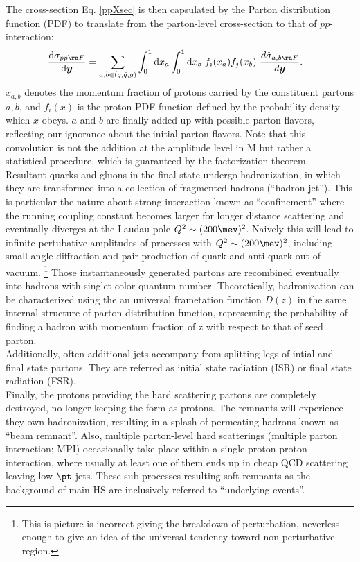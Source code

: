 The cross-section Eq. \ref{ppXsec} is then capsulated by the Parton distribution function (PDF) to translate from the parton-level cross-section to that of $pp$-interaction:
\begin{align}
\frac{\mathrm{d}\sigma_{pp\ra F}}{\mathrm{d}\bm{y}} & = \sum_{a,b\in (q,\bar{q},g)} \int_0^1 \mathrm{d}x_a \int_0^1 \mathrm{d}x_b \,\, f_i (x_a) f_j (x_b) \,\, \frac{d\hat{\sigma}_{a,b \ra F}}{d\bm{y}}.
\label{ppXsecWithPDF}
\end{align}
$x_{a,b}$ denotes the momentum fraction of protons carried by the constituent partons $a,b$, and $f_i(x)$ is the proton PDF function defined by the probability density which $x$ obeys. $a$ and $b$ are finally added up with possible parton flavors, reflecting our ignorance about the initial parton flavors.
Note that this convolution is not the addition at the amplitude level in $\mathrm{M}$ but rather a statistical procedure, which is guaranteed by the factorization theorem. \\

Resultant quarks and gluons in the final state undergo hadronization, in which they are transformed into a collection of fragmented hadrons (``hadron jet''). This is particular the nature about strong interaction known as ``confinement'' where the running coupling constant becomes larger for longer distance scattering and eventually diverges at the Laudau pole $Q^2\sim (200\mev)^2$. Naively this will lead to infinite pertubative amplitudes of processes with $Q^2\sim (200\mev)^2$, including small angle diffraction and pair production of quark and anti-quark out of vacuum. 
\footnote{This is picture is incorrect giving the breakdown of perturbation, neverless enough to give an idea of the universal tendency toward non-perturbative region.}
Those instantaneously generated partons are recombined eventually into hadrons with singlet color quantum number. Theoretically, hadronization can be characterized using the an universal frametation function $D(z)$ in the same internal structure of parton distribution function, representing the probability of finding a hadron with momentum fraction of z with respect to that of seed parton. \\

Additionally, often additional jets accompany from splitting legs of intial and final state partons. 
They are referred as initial state radiation (ISR) or final state radiation (FSR). \\

Finally, the protons providing the hard scattering partons are completely destroyed, no longer keeping the form as protons.
The remnants will experience they own hadronization, resulting in a splash of permeating hadrons known as ``beam remnant''.
Also, multiple parton-level hard scatterings (multiple parton interaction; MPI) occasionally take place within a single proton-proton interaction, where usually at least one of them ends up in cheap QCD scattering leaving low-$\pt$ jets.
These sub-processes resulting soft remnants as the background of main HS are inclusively referred to ``underlying events''.

